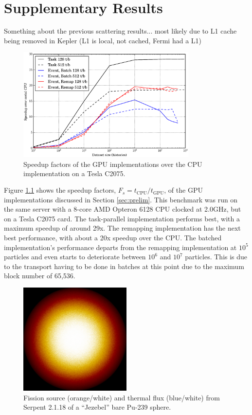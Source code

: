 \chapter{Supplementary Results}
\label{app:A}

Something about the previous scattering results...  most likely due to L1 cache being removed in Kepler (L1 is local, not cached, Fermi had a L1)

\begin{figure}[h!] 
  \centering
    \includegraphics[width=0.8\textwidth]{graphics/prelim_speedup_old.eps}
     \caption{Speedup factors of the GPU implementations over the CPU implementation on a Tesla C2075. \label{prelim_speedup_old} }
\end{figure}

Figure \ref{prelim_speedup_old} shows the speedup factors, $F_s=t_\mathrm{CPU}/t_\mathrm{GPU}$, of the GPU implementations discussed in Section \ref{sec:prelim}.  This benchmark was run on the same server with a 8-core AMD Opteron 6128 CPU clocked at 2.0GHz, but on a Tesla C2075 card.  The task-parallel implementation performs best, with a maximum speedup of around 29x.  The remapping implementation has the next best performance, with about a 20x speedup over the CPU. The batched implementation's performance departs from the remapping implementation at $10^5$ particles and even starts to deteriorate between $10^6$ and $10^7$ particles.  This is due to the transport having to be done in batches at this point due to the maximum block number of 65,536.

\begin{figure}[h!] 
  \centering
    \includegraphics[width=0.5\textwidth]{graphics/finalresults/serpent-benchmark-6/godiva_mesh1.png}
     \caption{Fission source (orange/white) and thermal flux (blue/white) from Serpent 2.1.18 of a ``Jezebel'' bare Pu-239 sphere. \label{serp_godiva_mesh} }
\end{figure}

